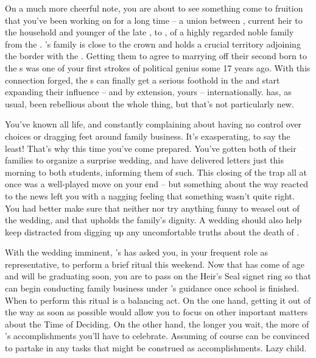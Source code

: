 \documentclass[char]{GL2020}
\begin{document}
On a much more cheerful note, you are about to see something come to fruition that you've been working on for a long time -- a union between \cHeir{\full}, current heir to the \cHeir{\formal} household and younger \cHeir{\sibling} of the late \cHeirSibling{}, to \cChupStudent{\full}, \cChupStudent{\child} of a highly regarded noble family from the \pFarm{}. \cChupStudent{}'s family is close to the crown and holds a crucial territory adjoining the border with the \pTech{}. Getting them to agree to marrying off their second born \cChupStudent{\child} to the \cHeir{\formal}s was one of your first strokes of political genius some 17 years ago. With this connection forged, the \cHeir{\formal}s can finally get a serious foothold in the \pFarm{} and start expanding their influence -- and by extension, yours -- internationally. \cHeir{} has, as usual, been rebellious about the whole thing, but that's not particularly new.

You've known \cHeir{} all \cHeir{\their} life, and \cHeir{\they} \cHeir{\are} constantly complaining about having no control over \cHeir{\their} choices or dragging \cHeir{\their} feet around family business. It's exasperating, to say the least! That's why this time you've come prepared. You've gotten both of their families to organize a surprise wedding, and have delivered letters just this morning to both students, informing them of such. This closing of the trap all at once was a well-played move on your end -- but something about the way \cHeir{} reacted to the news left you with a nagging feeling that something wasn't quite right. You had better make sure that neither \cHeir{} nor \cChupStudent{} try anything funny to weasel out of the wedding, and that \cHeir{} upholds the \cHeir{\formal} family's dignity. A wedding should also help keep \cHeir{} distracted from digging up any uncomfortable truths about the death of \cHeirSibling{}. 

With the wedding imminent, \cHeir{}'s \cFaledonParent{\parent} \cFaledonParent{\full} has asked you, in your frequent role as \cFaledonParent{\their} representative, to perform a brief ritual this weekend. Now that \cHeir{} has come of age and will be graduating soon, you are to pass on the Heir's Seal signet ring so that \cHeir{} can begin conducting family business under \cFaledonParent{}'s guidance once school is finished. When to perform this ritual is a balancing act. On the one hand, getting it out of the way as soon as possible would allow you to focus on other important matters about the Time of Deciding. On the other hand, the longer you wait, the more of \cHeir{}'s accomplishments you'll have to celebrate. Assuming of course \cHeir{} can be convinced to partake in any tasks that might be construed as accomplishments. Lazy child.
\end{document}
